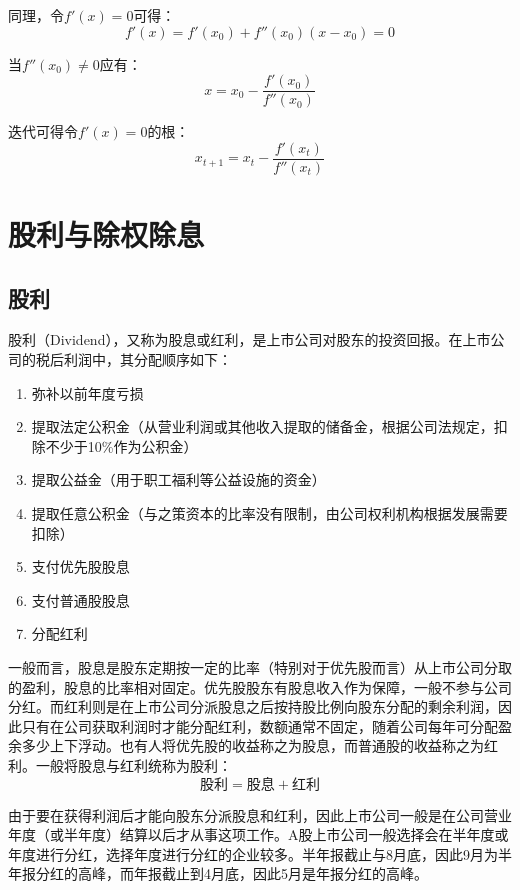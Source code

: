 \documentclass[11pt]{article}
\begin{document}
\begin{appendices}
同理，令$f'(x) = 0$可得：
\begin{equation*}
    f'(x) = f'(x_0) + f''(x_0)(x-x_0) = 0
\end{equation*}

当$f''(x_0) \neq 0$应有：
\begin{equation*}
    x = x_0 - \frac{f'(x_0)}{f''(x_0)}
\end{equation*}

迭代可得令$f'(x) = 0$的根：
\begin{equation*}
    x_{t+1} = x_t - \frac{f'(x_t)}{f''(x_t)}
\end{equation*}

\section{股利与除权除息}

\subsection*{股利}

股利（Dividend），又称为股息或红利，是上市公司对股东的投资回报。在上市公司的税后利润中，其分配顺序如下：
\begin{enumerate}
    \item 弥补以前年度亏损
    \item 提取法定公积金（从营业利润或其他收入提取的储备金，根据公司法规定，扣除不少于10\%作为公积金）
    \item 提取公益金（用于职工福利等公益设施的资金）
    \item 提取任意公积金（与之策资本的比率没有限制，由公司权利机构根据发展需要扣除）
    \item 支付优先股股息
    \item 支付普通股股息
    \item 分配红利
\end{enumerate}

一般而言，股息是股东定期按一定的比率（特别对于优先股而言）从上市公司分取的盈利，股息的比率相对固定。优先股股东有股息收入作为保障，一般不参与公司分红。而红利则是在上市公司分派股息之后按持股比例向股东分配的剩余利润，因此只有在公司获取利润时才能分配红利，数额通常不固定，随着公司每年可分配盈余多少上下浮动。也有人将优先股的收益称之为股息，而普通股的收益称之为红利。一般将股息与红利统称为股利：
\begin{equation*}
    \text{股利} = \text{股息} + \text{红利}
\end{equation*}

由于要在获得利润后才能向股东分派股息和红利，因此上市公司一般是在公司营业年度（或半年度）结算以后才从事这项工作。A股上市公司一般选择会在半年度或年度进行分红，选择年度进行分红的企业较多。半年报截止与8月底，因此9月为半年报分红的高峰，而年报截止到4月底，因此5月是年报分红的高峰。


\end{appendices}
\end{document}
